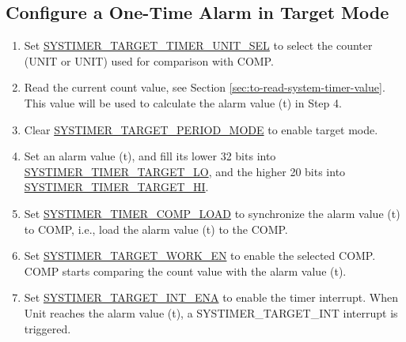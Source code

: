 \documentclass[main\_\_EN.tex]{subfiles}
\begin{document}
\subsection{Configure a One-Time Alarm in Target Mode}
\begin{enumerate}
    \item Set \hyperref[fielddesc:SYSTIMERTARGET0TIMERUNITSEL]{SYSTIMER\_TARGET\_TIMER\_UNIT\_SEL} to select the counter (UNIT or UNIT) used for comparison with COMP.
    \item Read the current count value, see Section \ref{sec:to-read-system-timer-value}. This value will be used to calculate the alarm value (t) in Step 4.
    \item Clear \hyperref[fielddesc:SYSTIMERTARGET0PERIODMODE]{SYSTIMER\_TARGET\_PERIOD\_MODE} to enable target mode.
    \item Set an alarm value (t), and fill its lower 32 bits into \hyperref[fielddesc:SYSTIMERTIMERTARGET0LO]{SYSTIMER\_TIMER\_TARGET\_LO}, and the higher 20 bits into \hyperref[fielddesc:SYSTIMERTIMERTARGET0HI]{SYSTIMER\_TIMER\_TARGET\_HI}.
    \item Set \hyperref[fielddesc:SYSTIMERTIMERCOMP0LOAD]{SYSTIMER\_TIMER\_COMP\_LOAD} to synchronize the alarm value (t) to COMP, i.e., load the alarm value (t) to the COMP.
    \item Set \hyperref[fielddesc:SYSTIMERTARGET0WORKEN]{SYSTIMER\_TARGET\_WORK\_EN} to enable the selected COMP. COMP starts comparing the count value with the alarm value (t).
    \item Set \hyperref[fielddesc:SYSTIMERTARGET0INTENA]{SYSTIMER\_TARGET\_INT\_ENA} to enable the timer interrupt. When Unit reaches the alarm value (t), a SYSTIMER\_TARGET\_INT interrupt is triggered.
\end{enumerate}
\end{document}
